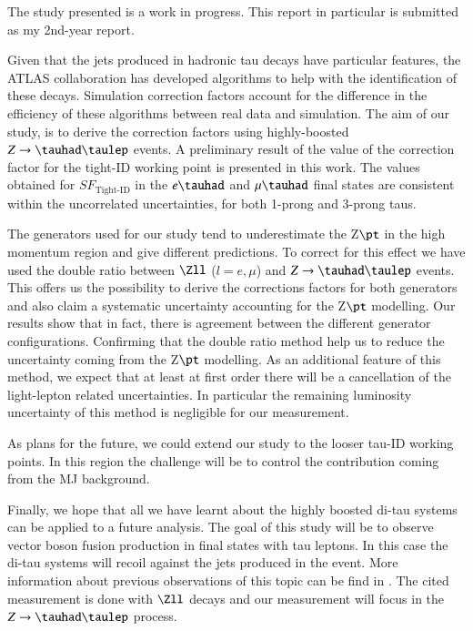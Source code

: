 The study presented is a work in progress. This report in particular is submitted as my 2nd-year report.

Given that the jets produced in hadronic tau decays have particular features, the ATLAS collaboration has developed algorithms to help with the identification of these decays. Simulation correction factors account for the difference in the efficiency of these algorithms between real data and simulation. The aim of our study, is to derive the correction factors using highly-boosted $Z\to\tauhad\taulep$ events. A preliminary result of the value of the correction factor for the tight-ID working point is presented in this work. The values obtained for $SF_{\text{Tight-ID}}$ in the $e\tauhad$ and $\mu\tauhad$ final states are consistent within the uncorrelated uncertainties, for both 1-prong and 3-prong taus.


The generators used for our study tend to underestimate the Z$\pt$ in the high momentum region and give different predictions. To correct for this effect we have used the double ratio between $\Zll$ ($l=e,\mu$) and $Z\to\tauhad\taulep$ events. This offers us the possibility to derive the corrections factors for both generators and also claim a systematic uncertainty accounting for the Z$\pt$ modelling. Our results show that in fact, there is agreement between the different generator configurations. Confirming that the double ratio method help us to reduce the uncertainty coming from the Z$\pt$ modelling. As an additional feature of this method, we expect that at least at first order there will be a cancellation of the light-lepton related uncertainties. In particular the remaining luminosity uncertainty of this method is negligible for our measurement.


As plans for the future, we could extend our study to the looser tau-ID working points. In this region the challenge will be to control the contribution coming from the MJ background. 

Finally, we hope that all we have learnt about the highly boosted di-tau systems can be applied to a future analysis.  The goal of this study will be to observe vector boson fusion production in final states with tau leptons. In this case the di-tau systems will recoil against the jets produced in the event. More information about previous observations of this topic can be find in \cite{Aad:2014dta,Aaboud:2017emo}. The cited measurement is done with $\Zll$ decays and our measurement will focus in the $Z\to\tauhad\taulep$ process.